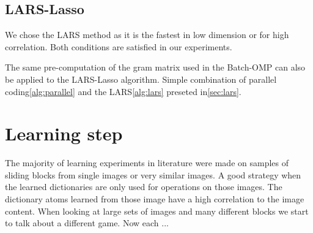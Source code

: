 


\subsection{LARS-Lasso}
We chose the LARS method as it is the fastest in low dimension or for
high correlation. Both conditions are satisfied in our experiments.

The same pre-computation of the gram matrix used in the Batch-OMP can also
be applied to the LARS-Lasso algorithm. Simple combination of
parallel coding\ref{alg:parallel} and the LARS\ref{alg:lars} preseted
in\ref{sec:lars}.


\section{Learning step}
The majority of learning experiments in literature were made on
samples of sliding blocks from single images or very similar images.
A good strategy when the learned dictionaries are only used for operations on
those images. The dictionary atoms learned from those image have a high
correlation to the image content.  When looking at large sets of images and many
different blocks we start to talk about a different game. Now each ...

